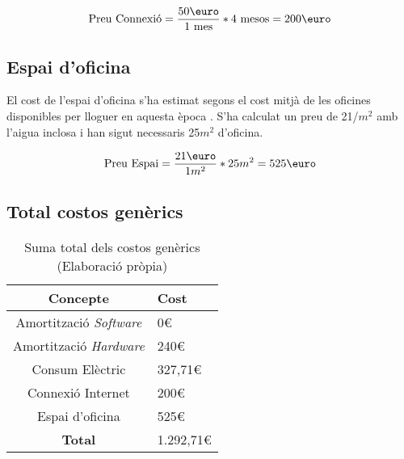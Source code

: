 $$
\text{Preu Connexió} = \frac{50 \text{\euro}}{1 \text{ mes}} * 4 \text{ mesos} = 200\text{\euro}
$$

\subsection{Espai d'oficina}
El cost de l'espai d'oficina s'ha estimat segons el cost mitjà de les oficines disponibles per lloguer en aquesta època \cite{preu-oficina}. S'ha calculat un preu de 21\text{\euro}/$m^2$ amb l'aigua inclosa i han sigut necessaris 25$m^2$ d'oficina.

$$
\text{Preu Espai} = \frac{21 \text{\euro}}{1 m^2} * 25 m^2 = 525\text{\euro}
$$

\subsection{Total costos genèrics}


\begin{table}[H]
    \centering
    \begin{tabular}{c|l}
        \textbf{Concepte}     & \textbf{Cost} \\
        \hline
        Amortització \textit{Software} & 0\euro         \\
        Amortització \textit{Hardware} & 240\euro       \\
        Consum Elèctric                & 327,71\euro    \\
        Connexió Internet              & 200\euro       \\
        Espai d'oficina                & 525\euro       \\
        \hline
        \textbf{Total}                 & 1.292,71\euro   \\
    \end{tabular}
    \caption[Costos genèrics]{Suma total dels costos genèrics \\ (Elaboració pròpia)}
    \label{tab:costos_generics}
\end{table}
